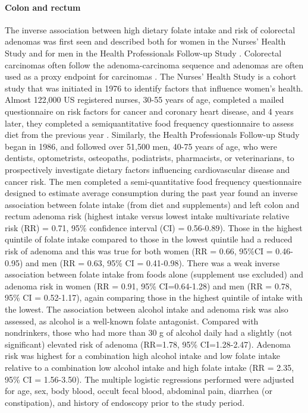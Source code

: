 \paragraph{Colon and rectum} %
The inverse association between high dietary folate intake and risk of colorectal adenomas was first seen and described both for women in the Nurses' Health Study and for men in the Health Professionals Follow-up Study \cite{c229}. Colorectal carcinomas often follow the adenoma-carcinoma sequence and adenomas are often used as a proxy endpoint for carcinomas \cite{c230}. The Nurses' Health Study is a cohort study that was initiated in 1976 to identify factors that influence women's health. Almost 122,000 US registered nurses, 30-55 years of age, completed a mailed questionnaire on risk factors for cancer and coronary heart disease, and 4 years later, they completed a semiquantitative food frequency questionnaire to assess diet from the previous year \cite{c231}. Similarly, the Health Professionals Follow-up Study began in 1986, and followed over 51,500 men, 40-75 years of age, who were dentists, optometrists, osteopaths, podiatrists, pharmacists, or veterinarians, to prospectively investigate dietary factors influencing cardiovascular disease and cancer risk. The men completed a semi-quantitative food frequency questionnaire designed to estimate average consumption during the past year \cite{c229,c232} found an inverse association between folate intake (from diet and supplements) and left colon and rectum adenoma risk (highest intake versus lowest intake multivariate relative risk (RR) = 0.71, 95\% confidence interval (CI) = 0.56-0.89). Those in the highest quintile of folate intake compared to those in the lowest quintile had a reduced risk of adenoma and this was true for both women (RR = 0.66, 95\%CI = 0.46-0.95) and men (RR = 0.63, 95\% CI = 0.41-0.98). There was a weak inverse association between folate intake from foods alone (supplement use excluded) and adenoma risk in women (RR = 0.91, 95\% CI=0.64-1.28) and men (RR = 0.78, 95\% CI = 0.52-1.17), again comparing those in the highest quintile of intake with the lowest. The association between alcohol intake and adenoma risk was also assessed, as alcohol 
is a well-known folate antagonist. Compared with nondrinkers, those who had more than 30 g of alcohol daily had a slightly (not significant) elevated risk of adenoma (RR=1.78, 95\% CI=1.28-2.47). Adenoma risk was highest for a combination high alcohol intake and low folate intake relative to a combination low alcohol intake and high folate intake (RR = 2.35, 95\% CI = 1.56-3.50). The multiple logistic regressions performed were adjusted for age, sex, body blood, occult fecal blood, abdominal pain, diarrhea (or constipation), and history of endoscopy prior to the study period. 
 
